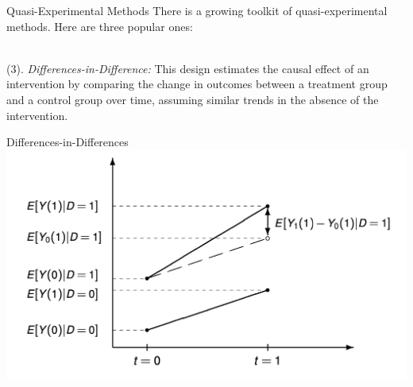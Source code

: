 \documentclass{./../div_teaching_slides}
\begin{document}
\begin{frame}{Quasi-Experimental Methods}
There is a growing toolkit of quasi-experimental methods. Here are three popular ones: \\~\\
\begin{witemize}
  \item[(3).] \textit{Differences-in-Difference:} This design estimates the causal effect of an intervention by comparing the change in outcomes between a treatment group and a control group over time, assuming similar trends in the absence of the intervention.
 \end{witemize}
\end{frame}

\begin{frame}{Differences-in-Differences}
\centering
\includegraphics[scale=0.3]{dd.png}
\end{frame}
\end{document}
